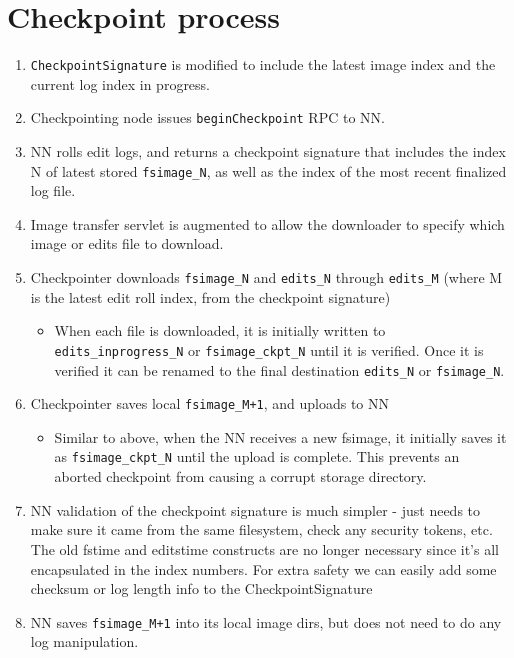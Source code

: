 \documentclass{article}
\begin{document}
\section{Checkpoint process}
\label{2nn-checkpoint}
\begin{enumerate}
\item {\tt CheckpointSignature} is modified to include the latest image index and the current log index in progress.
\item Checkpointing node issues {\tt beginCheckpoint} RPC to NN.
\item NN rolls edit logs, and returns a checkpoint signature that includes the index N of latest stored {\tt fsimage\_N}, as well as the index of the most recent finalized log file.
\item Image transfer servlet is augmented to allow the downloader to specify which image or edits file to download.
\item Checkpointer downloads {\tt fsimage\_N} and {\tt edits\_N} through {\tt edits\_M} (where M is the latest edit roll index, from the checkpoint signature)
  \begin{itemize}
  \item When each file is downloaded, it is initially written to {\tt edits\_inprogress\_N} or {\tt fsimage\_ckpt\_N} until it is verified. Once it is verified it can be renamed to the final destination {\tt edits\_N} or {\tt fsimage\_N}.
  \end{itemize}
 
\item Checkpointer saves local {\tt fsimage\_M+1}, and uploads to NN
  \begin{itemize}
  \item Similar to above, when the NN receives a new fsimage, it initially saves it as {\tt fsimage\_ckpt\_N} until the upload is complete. This prevents an aborted checkpoint from causing a corrupt storage directory.
  \end{itemize}
\item NN validation of the checkpoint signature is much simpler - just needs to make sure it came from the same filesystem, check any security tokens, etc. The old fstime and editstime constructs are no longer necessary since it's all encapsulated in the index numbers. For extra safety we can easily add some checksum or log length info to the CheckpointSignature
\item NN saves {\tt fsimage\_M+1} into its local image dirs, but does not need to do any log manipulation.
\end{enumerate}
\end{document}
